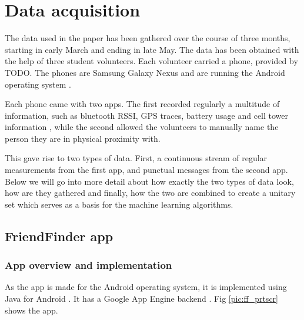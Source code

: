 \chapter{Data acquisition}

The data used in the paper has been gathered over the course of three months, starting in early March and ending in late May. The data has been obtained with the help of three student volunteers. Each volunteer carried a phone, provided by TODO. The phones are Samsung Galaxy Nexus and are running the Android operating system \cite{android}. 

Each phone came with two apps. The first recorded regularly a multitude of information, such as bluetooth RSSI, GPS traces, battery usage and cell tower information \cite{Stopczynski}, while the second allowed the volunteers to manually name the person they are in physical proximity with. 

This gave rise to two types of data. First, a continuous stream of regular measurements from the first app, and punctual messages from the second app. Below we will go into more detail about how exactly the two types of data look, how are they gathered and finally, how the two are combined to create a unitary set which serves as a basis for the machine learning algorithms.

\section{FriendFinder app}

\subsection{App overview and implementation}

As the app is made for the Android operating system, it is implemented using Java for Android \cite{jandroid}. It has a Google App Engine backend \cite{googleapp}. Fig \ref{pic:ff_prtscr} shows the app. 

